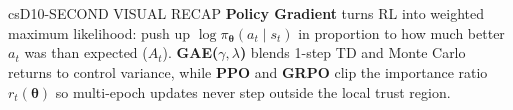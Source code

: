 \documentclass[../../../../master.tex]{subfiles}
\begin{document}
\begin{cscolumns}
\begin{cscard}{csD}{10-SECOND VISUAL RECAP}
  \sffamily\footnotesize
  \textbf{Policy Gradient} turns RL into weighted maximum likelihood: push up $\log\pi_{\bm{\theta}}(a_t\mid s_t)$ in proportion to how much better $a_t$ was than expected ($\hat{A}_t$).
  \textbf{GAE($\gamma,\lambda$)} blends 1-step TD and Monte Carlo returns to control variance, while \textbf{PPO} and \textbf{GRPO} clip the importance ratio $r_t(\bm{\theta})$ so multi-epoch updates never step outside the local trust region.
\end{cscard}
\end{cscolumns}

\csend
\end{document}
